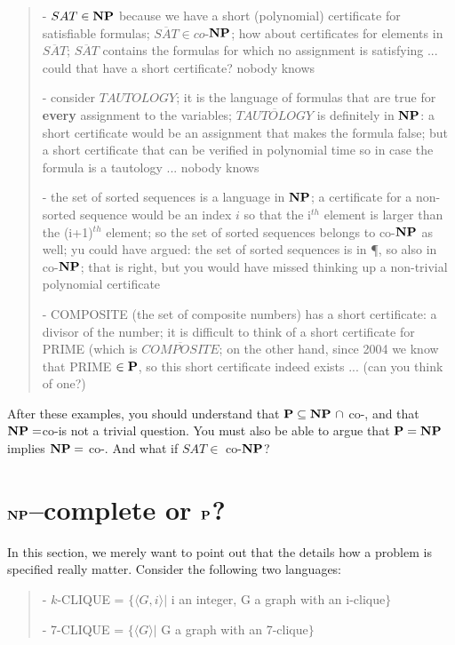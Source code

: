 \begin{verse}
- $SAT \in \NP$ because we have a short (polynomial) certificate for
satisfiable formulas; $\overline{SAT} \in co$-$\NP$; how about
certificates for elements in $\overline{SAT}$; $\overline{SAT}$
contains the formulas for which no assignment is satisfying ... could
that have a short certificate? nobody knows

- consider $TAUTOLOGY$; it is the language of formulas that are true
for {\bf every} assignment to the variables; $\overline{TAUTOLOGY}$
is definitely in $\NP$: a short certificate would be an assignment
that makes the formula false; but a short certificate that can be
verified in polynomial time so in case the formula is a tautology
... nobody knows

- the set of sorted sequences is a language in $\NP$; a certificate
for a non-sorted sequence would be an index $i$ so that the i$^{th}$
element is larger than the (i+1)$^{th}$ element; so the set of sorted
sequences belongs to co-$\NP$ as well; yu could have argued: the set
of sorted sequences is in \P, so also in co-$\NP$; that is right, but
you would have missed thinking up a non-trivial polynomial certificate


- COMPOSITE (the set of composite numbers) has a short certificate: a
divisor of the number; it is difficult to think of a short
certificate for PRIME (which is $\overline{COMPOSITE}$; on the other
hand, since 2004 we know that PRIME $\in \P$, so this short
certificate indeed exists ... (can you think of one?)
\end{verse}


After these examples, you should understand that $\P \subseteq \NP
~\cap$ co-\NP, and that $\NP = $co-\NP is not a trivial question. You
must also be able to argue that $\P = \NP$ implies $\NP = $ co-\NP.
And what if $SAT \in$ co-$\NP$?

\section{$\NP$--complete or $\P$?}

In this section, we merely want to point out that the details how a
problem is specified really matter. Consider the following two
languages:

\begin{verse}
- $k$-CLIQUE = $\{\langle G,i \rangle|$ i an integer, G a graph with an i-clique$\}$

- 7-CLIQUE = $\{\langle G \rangle|$ G a graph with an 7-clique$\}$
\end{verse}

